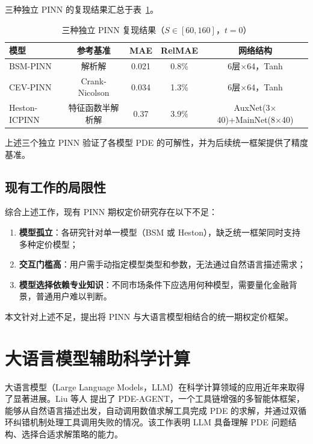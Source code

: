 三种独立 PINN 的复现结果汇总于表~\ref{tab:reproduction}。

\begin{table}[htbp]
  \centering
  \caption{三种独立 PINN 复现结果（$S\in[60,160]$，$t=0$）}
  \label{tab:reproduction}
  \begin{tabular}{lcccc}
    \hline
    模型 & 参考基准 & MAE & RelMAE & 网络结构 \\
    \hline
    BSM-PINN   & 解析解        & 0.021 & 0.8\%  & 6层$\times$64，Tanh \\
    CEV-PINN   & Crank-Nicolson & 0.034 & 1.3\%  & 6层$\times$64，Tanh \\
    Heston-ICPINN & 特征函数半解析解 & 0.37  & 3.9\%  & AuxNet(3$\times$40)+MainNet(8$\times$40) \\
    \hline
  \end{tabular}
\end{table}

上述三个独立 PINN 验证了各模型 PDE 的可解性，并为后续统一框架提供了精度基准。

\subsection{现有工作的局限性}

综合上述工作，现有 PINN 期权定价研究存在以下不足：
\begin{enumerate}
  \item \textbf{模型孤立}：各研究针对单一模型（BSM 或 Heston），缺乏统一框架同时支持多种定价模型；
  \item \textbf{交互门槛高}：用户需手动指定模型类型和参数，无法通过自然语言描述需求；
  \item \textbf{模型选择依赖专业知识}：不同市场条件下应选用何种模型，需要量化金融背景，普通用户难以判断。
\end{enumerate}
本文针对上述不足，提出将 PINN 与大语言模型相结合的统一期权定价框架。

\section{大语言模型辅助科学计算}\label{sec:llm_sci}

大语言模型（Large Language Models，LLM）在科学计算领域的应用近年来取得了显著进展。Liu 等人\citep{liu2025pdeagent} 提出了 PDE-AGENT，一个工具链增强的多智能体框架，能够从自然语言描述出发，自动调用数值求解工具完成 PDE 的求解，并通过双循环纠错机制处理工具调用失败的情况。该工作表明 LLM 具备理解 PDE 问题结构、选择合适求解策略的能力。

